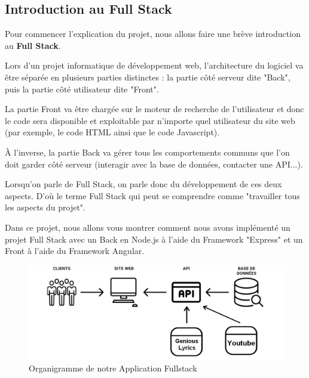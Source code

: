 \documentclass[12pt,french]{article}
\begin{document}
\subsection{Introduction au Full Stack}

Pour commencer l'explication du projet, nous allons faire une brève introduction au \textbf{Full Stack}.

\medskip

Lors d'un projet informatique de développement web, l'architecture du logiciel va être séparée en plusieurs parties distinctes : la partie côté serveur dite "\gls{Back}", puis la partie côté utilisateur dite "\gls{Front}".

\medskip

La partie \gls{Front} va être chargée sur le moteur de recherche de l'utilisateur et donc le code sera disponible et exploitable par n'importe quel utilisateur du site web (par exemple, le code \gls{HTML} ainsi que le code \gls{Javascript}).

\medskip

À l'inverse, la partie \gls{Back} va gérer tous les comportements communs que l'on doit garder côté serveur (interagir avec la base de données, contacter une \gls{API}...).

\medskip

Lorsqu'on parle de Full Stack, on parle donc du développement de ces deux aspects. D'où le terme Full Stack qui peut se comprendre comme "travailler tous les aspects du projet".

\medskip

Dans ce projet, nous allons vous montrer comment nous avons implémenté un projet Full Stack avec un \gls{Back} en Node.js à l'aide du \gls{Framework} "Express" et un \gls{Front} à l'aide du \gls{Framework} Angular.

\begin{figure}[H]
	\centering
	\includegraphics[scale=0.4]{fullstack.png}
	\caption{Organigramme de notre Application Fullstack}    
\end{figure}
\end{document}
